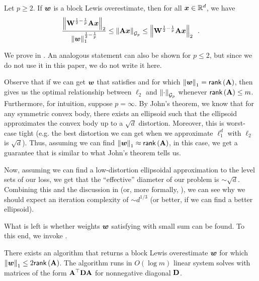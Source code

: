 \begin{theorem}
\label{thm:blw_to_l2}
Let $p \ge 2$. If $\bm{w}$ is a block Lewis overestimate, then for all $\bm{x}\in\mathbb{R}^d$, we have
\begin{align*}
    \frac{\left\lVert \mathbf{W}^{\frac{1}{2}-\frac{1}{p}}\mathbf{A}\bm{x} \right\rVert_2}{\left\lVert \bm{w} \right\rVert_1^{\frac{1}{2}-\frac{1}{p}}} \le \left\lVert \mathbf{A}\bm{x} \right\rVert_{\mathcal{G}_{p}} \le \left\lVert \mathbf{W}^{\frac{1}{2}-\frac{1}{p}}\mathbf{A}\bm{x} \right\rVert_2\enspace.
\end{align*}
\end{theorem}

We prove  in . An analogous statement can also be shown for $p\le2$, but since we do not use it in this paper, we do not write it here.

Observe that if we can get $\bm{w}$ that satisfies  and for which $\left\lVert \bm{w} \right\rVert_1 = \mathsf{rank}\left(\mathbf{A}\right)$, then  gives us the optimal relationship between $\ell_2$ and $\left\lVert \cdot \right\rVert_{\mathcal{G}_{p}}$ whenever $\mathsf{rank}\left(\mathbf{A}\right) \le m$. Furthermore, for intuition, suppose $p=\infty$. By John's theorem, we know that for any symmetric convex body, there exists an ellipsoid such that the ellipsoid approximates the convex body up to a $\sqrt{d}$ distortion. Moreover, this is worst-case tight (e.g. the best distortion we can get when we approximate $\ell_1^d$ with $\ell_2$ is $\sqrt{d}$). Thus, assuming we can find $\left\lVert \bm{w} \right\rVert_1 \approx \mathsf{rank}\left(\mathbf{A}\right)$, in this case, we get a guarantee that is similar to what John's theorem tells us.

Now, assuming we can find a low-distortion ellipsoidal approximation to the level sets of our loss, we get that the ``effective'' diameter of our problem is $\sim \sqrt{d}$. Combining this and the discussion in  (or, more formally, ), we can see why we should expect an iteration complexity of $\sim d^{1/3}$ (or better, if we can find a better ellipsoid).

What is left is whether weights $\bm{w}$ satisfying  with small sum can be found. To this end, we invoke \cite[Algorithm 2]{mo23}.

\begin{theorem}
\label{thm:gp_regression_blw_alg}
There exists an algorithm that returns a block Lewis overestimate $\bm{w}$ for which $\left\lVert \bm{w} \right\rVert_1 \le 2\mathsf{rank}\left(\mathbf{A}\right)$. The algorithm runs in $O(\log m)$ linear system solves with matrices of the form $\mathbf{A}^{\top}\mathbf{D}\mathbf{A}$ for nonnegative diagonal $\mathbf{D}$.
\end{theorem}

